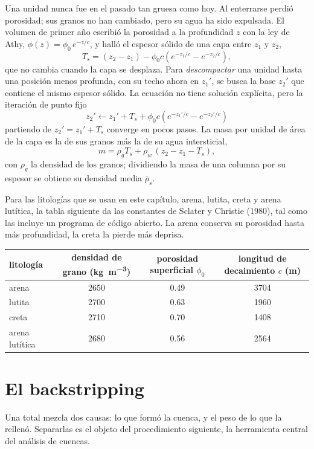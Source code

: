 Una unidad nunca fue en el pasado tan gruesa como hoy. Al enterrarse perdió porosidad; sus granos no han
cambiado, pero su agua ha sido expulsada. El volumen de primer año escribió la porosidad a la profundidad
$z$ con la ley de Athy, $\phi(z) = \phi_0\,e^{-z/c}$, y halló el espesor sólido de una capa entre
$z_1$ y $z_2$,
\[
  T_s = (z_2 - z_1) - \phi_0 c\left(e^{-z_1/c} - e^{-z_2/c}\right),
\]
que no cambia cuando la capa se desplaza. Para \emph{descompactar} una unidad hasta una posición menos profunda,
con su techo ahora en $z_1'$, se busca la base $z_2'$ que contiene el mismo espesor sólido. La
ecuación no tiene solución explícita, pero la iteración de punto fijo
\[
  z_2' \leftarrow z_1' + T_s + \phi_0 c\left(e^{-z_1'/c} - e^{-z_2'/c}\right)
\]
partiendo de $z_2' = z_1' + T_s$ converge en pocos pasos. La masa por unidad de área de la capa
es la de sus granos más la de su agua intersticial,
\[
  m = \rho_g T_s + \rho_w\,(z_2 - z_1 - T_s),
\]
con $\rho_g$ la densidad de los granos; dividiendo la masa de una columna por su espesor se obtiene
su densidad media $\bar\rho_s$.

Para las litologías que se usan en este capítulo, arena, lutita, creta y arena lutítica, la tabla siguiente
da las constantes de Sclater y Christie (1980), tal como las incluye un programa de código abierto.
La arena conserva su porosidad hasta más profundidad, la creta la pierde más deprisa.

\begin{center}
\small
\begin{tabular}{lccc}
\hline
litología & densidad de grano (\unit{kg.m^{-3}}) & porosidad superficial $\phi_0$ & longitud de decaimiento $c$ (\unit{m}) \\
\hline
arena & 2650 & 0.49 & 3704 \\
lutita & 2700 & 0.63 & 1960 \\
creta & 2710 & 0.70 & 1408 \\
arena lutítica & 2680 & 0.56 & 2564 \\
\hline
\end{tabular}
\end{center}

\section{El backstripping}\label{sec:b2:basins-compared:backstripping}

Una  total mezcla dos causas: lo que formó la cuenca, y el peso de lo que
la rellenó. Separarlas es el objeto del procedimiento siguiente, la herramienta central del análisis de
cuencas.

